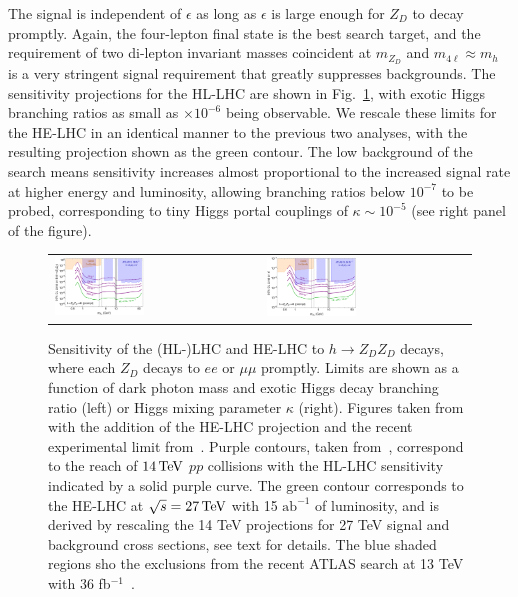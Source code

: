 The signal is independent of $\epsilon$ as long as $\epsilon$ is large enough for $Z_D$ to decay promptly. 
%
Again, the four-lepton final state is the best search target, and the requirement of two di-lepton invariant masses coincident at $m_{Z_D}$ and $m_{4 \ell} \approx m_h$ is a very stringent signal requirement that greatly suppresses backgrounds. 
%
The sensitivity projections for the HL-LHC are shown in Fig.~\ref{f.darkphotonZDZDprompt}, with exotic Higgs branching ratios as small as $\times 10^{-6}$ being observable. 
%
We rescale these limits for the HE-LHC in an identical manner to the previous two analyses, with the resulting projection shown as the green contour. The low background of the search means sensitivity increases almost proportional to the increased signal rate at higher energy and luminosity, allowing branching ratios below $10^{-7}$ to be probed, corresponding to tiny Higgs portal couplings of $\kappa \sim 10^{-5}$ (see right panel of the figure). 


\begin{figure}
\begin{tabular}{m{} m{}}
\includegraphics[width=0.45\textwidth]{section9/plots/FORPAPER_HiggsMixingLimitsBrHZdZd_14_27_TeV}
&
\includegraphics[width=0.45\textwidth]{section9/plots/FORPAPER_HiggsMixingLimitskappaprime_14_27_TeV}
\end{tabular}
\caption{
Sensitivity of the (HL-)LHC and HE-LHC to  $h \to Z_D Z_D$ decays, where each $Z_D$ decays to $ee$ or $\mu \mu$ promptly. Limits are shown as a function of dark photon mass and exotic Higgs decay branching ratio (left) or Higgs mixing parameter $\kappa$ (right). 
%
Figures taken from~\cite{Curtin:2014cca} with the addition of the HE-LHC projection and the recent experimental limit from~\cite{Aaboud:2018fvk}.
%
 Purple contours, taken from~\cite{Curtin:2014cca}, correspond to the reach of $14 \,\text{Te\hspace{-.08em}V}$ $pp$ collisions with the HL-LHC sensitivity indicated by a solid purple curve. The green contour corresponds to the HE-LHC at $\sqrt{s} = 27 \,\text{Te\hspace{-.08em}V}$ with 15 $\mathrm{ab}^{-1}$ of luminosity, and is derived by rescaling the 14 TeV projections for 27 TeV signal and background cross sections, see text for details. The blue shaded regions sho the exclusions from the recent ATLAS search at 13 TeV with 36 fb$^{-1}$~\cite{Aaboud:2018fvk}.
}
\label{f.darkphotonZDZDprompt}
\end{figure}


